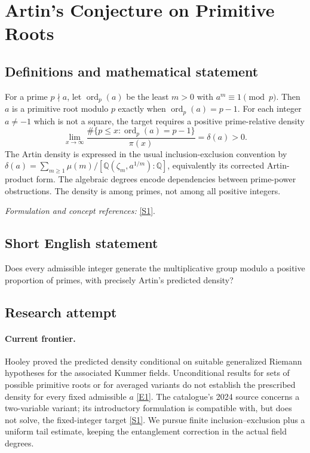 \documentclass[11pt,a4paper]{article}
\newcommand{\Q}{\mathbb{Q}}
\newcommand{\sref}[2]{\hyperlink{source:#1:#2}{[S#2]}}
\newcommand{\eref}[2]{\hyperlink{extra:#1:#2}{[E#2]}}
\newif\ifshowcatalogue
\newcommand{\cataloguescope}[1]{\ifshowcatalogue
 \paragraph{Exact scope in the supplied catalogue.}
 \begin{quote}\small #1\end{quote}\fi}
\numberwithin{equation}{section}
\begin{document}
\setcounter{section}{0}
\clearpage
\section*{\texorpdfstring{Artin's Conjecture on Primitive Roots}{Artin's Conjecture on Primitive Roots}}\label{1183}
\subsection{Definitions and mathematical statement}
For a prime $p\nmid a$, let $\operatorname{ord}_p(a)$ be the least $m>0$ with $a^m\equiv1\pmod p$. Then $a$ is a primitive root modulo $p$ exactly when $\operatorname{ord}_p(a)=p-1$. For each integer $a\ne-1$ which is not a square, the target requires a positive prime-relative density
\[
 \lim_{x\to\infty}\frac{\#\{p\le x:\operatorname{ord}_p(a)=p-1\}}{\pi(x)}=\delta(a)>0.
\]
The Artin density is expressed in the usual inclusion-exclusion convention by
$\delta(a)=\sum_{m\ge1}\mu(m)/[\Q(\zeta_m,a^{1/m}):\Q]$, equivalently its corrected Artin-product form. The algebraic degrees encode dependencies between prime-power obstructions. The density is among primes, not among all positive integers.
\par\smallskip\textit{Formulation and concept references:} \sref{1183}{1}.
\cataloguescope{Prove or disprove that every integer a other than -1 that is not a perfect square is a primitive root modulo p for a positive natural density of primes p, with the density given by Artin's predicted correction factor.}
\subsection{Short English statement}
Does every admissible integer generate the multiplicative group modulo a positive proportion of primes, with precisely Artin's predicted density?
\subsection{Research attempt}

\paragraph{Current frontier.}
Hooley proved the predicted density conditional on suitable generalized Riemann hypotheses for the associated Kummer fields. Unconditional results for sets of possible primitive roots or for averaged variants do not establish the prescribed density for every fixed admissible $a$ \eref{1183}{1}. The catalogue's 2024 source concerns a two-variable variant; its introductory formulation is compatible with, but does not solve, the fixed-integer target \sref{1183}{1}. We pursue finite inclusion--exclusion plus a uniform tail estimate, keeping the entanglement correction in the actual field degrees.
\end{document}
